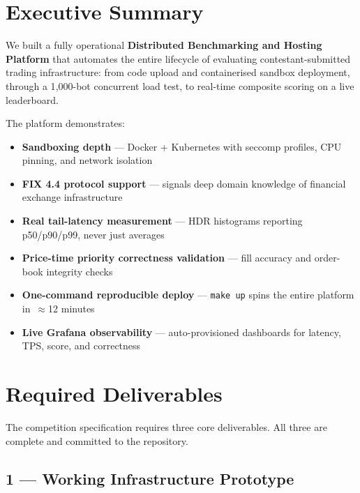 \documentclass[12pt,a4paper]{article}
\begin{document}
\tableofcontents
\newpage

\section{Executive Summary}

We built a fully operational \textbf{Distributed Benchmarking and Hosting Platform} that automates the entire lifecycle of evaluating contestant-submitted trading infrastructure: from code upload and containerised sandbox deployment, through a 1{,}000-bot concurrent load test, to real-time composite scoring on a live leaderboard.

The platform demonstrates:
\begin{itemize}[leftmargin=1.5em]
  \item \textbf{Sandboxing depth} — Docker + Kubernetes with seccomp profiles, CPU pinning, and network isolation
  \item \textbf{FIX 4.4 protocol support} — signals deep domain knowledge of financial exchange infrastructure
  \item \textbf{Real tail-latency measurement} — HDR histograms reporting p50/p90/p99, never just averages
  \item \textbf{Price-time priority correctness validation} — fill accuracy and order-book integrity checks
  \item \textbf{One-command reproducible deploy} — \texttt{make up} spins the entire platform in~$\approx$12 minutes
  \item \textbf{Live Grafana observability} — auto-provisioned dashboards for latency, TPS, score, and correctness
\end{itemize}

\section{Required Deliverables}

The competition specification requires three core deliverables. All three are complete and committed to the repository.

\subsection{1 — Working Infrastructure Prototype}
\end{document}
